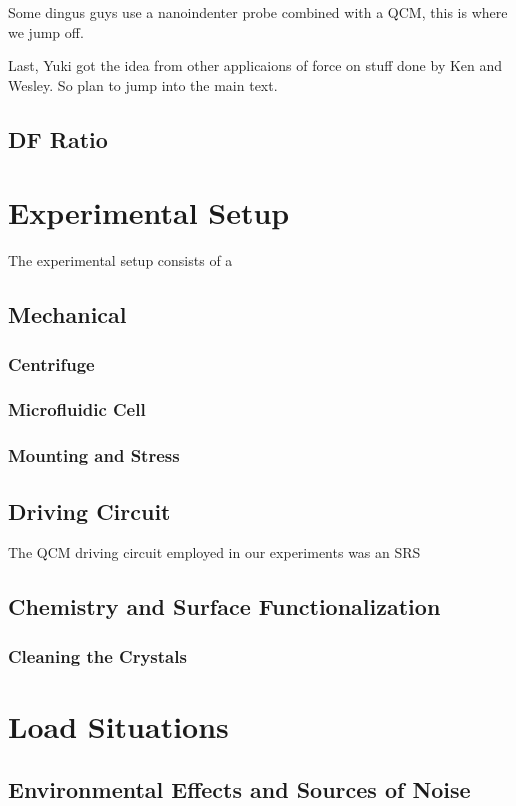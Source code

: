 \documentclass[a4paper,titlepage,onecolumn]{report}
\begin{document}
Some dingus guys use a nanoindenter probe combined with a QCM, this is
where we jump off.

Last, Yuki got the idea from other applicaions of force on stuff done by
Ken and Wesley.  So plan to jump into the main text.

\section{DF Ratio}
\chapter{Experimental Setup}
The experimental setup consists of a 
\section{Mechanical}
\subsection{Centrifuge}
\subsection{Microfluidic Cell}
\subsection{Mounting and Stress}

\section{Driving Circuit}
The QCM driving circuit employed in our experiments was an SRS 

\section{Chemistry and Surface Functionalization}
\subsection{Cleaning the Crystals}

\chapter{Load Situations}
\section{Environmental Effects and Sources of Noise}
\end{document}
